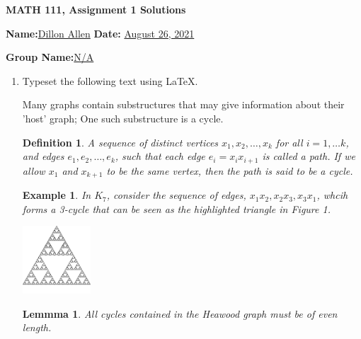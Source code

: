 \documentclass[11pt]{amsart}
\newtheorem{definition}{Definition}
\newtheorem{example}{Example}
\newtheorem{lemma}{Lemmma}
\begin{document}
\begin{center}
\textbf{MATH 111, Assignment 1 Solutions}%
\end{center}

\vspace{.3 in}

\textbf{Name:}\underline{Dillon Allen} \hspace{1in} \textbf{Date:} \underline{August 26, 2021}%

\textbf{Group Name:}\underline{N/A}

\vspace{.3in}

\begin{enumerate}

\item Typeset the following text using LaTeX.

\vspace{.3in}
Many graphs contain substructures that may give information about their 'host' graph; One such substructure is a cycle.

\begin{definition}
	A sequence of distinct vertices $x_1, x_2, \ldots, x_k$ for all $i = 1, \ldots k$, and edges $e_1, e_2, \ldots, e_k$, such that each edge $e_i = x_i x_{i+1}$ is called a path. If we allow $x_1$ and $x_{k+1}$ to be the same vertex, then the path is said to be a cycle.
\end{definition}

\begin{example}
In $K_7$, consider the sequence of edges, $ x_1 x_2, x_2 x_3, x_3 x_1 $, whcih forms a 3-cycle that can be seen as the highlighted triangle in Figure 1.
\end{example}
\begin{center}
\includegraphics[height=1in]{sierpinski_triangle.png}
\end{center}

\begin{lemma}
All cycles contained in the Heawood graph must be of even length.
\end{lemma}


\end{enumerate}
\end{document}
